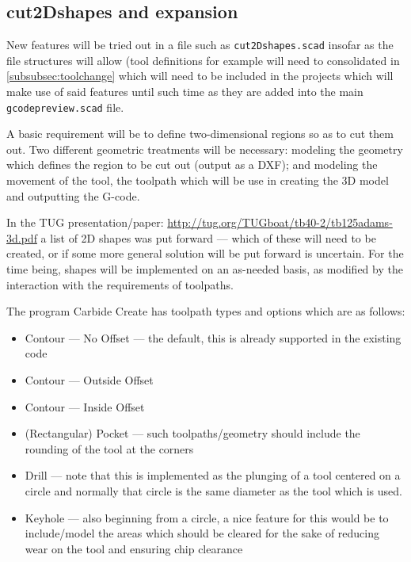 \documentclass{ltxdoc}
\begin{document}
\begin{samepage}
\section{cut2Dshapes and expansion}
 
New features will be tried out in a file such as \texttt{cut2Dshapes.scad} insofar as the 
file structures will allow (tool definitions for example will need to consolidated in 
\ref{subsubsec:toolchange} which will need
to be included in the projects which will make use of said features until such time
as they are added into the main \texttt{gcodepreview.scad} file.

A basic requirement will be to define two-dimensional regions so as to cut them out.
Two different geometric treatments will be necessary: modeling the geometry which 
defines the region to be cut out (output as a DXF); and modeling the movement of the
tool, the toolpath which will be use in creating the 3D model and outputting the 
G-code.

In the TUG presentation/paper: \url{http://tug.org/TUGboat/tb40-2/tb125adams-3d.pdf}
a list of 2D shapes was put forward --- which of these will need to be created,
or if some more general solution will be put forward is uncertain. For the time
being, shapes will be implemented on an as-needed basis, as modified by the
interaction with the requirements of toolpaths.

The program Carbide Create has toolpath types and options which are as follows:

\begin{itemize}
 \item Contour --- No Offset --- the default, this is already supported in the existing code
 \item Contour --- Outside Offset
 \item Contour --- Inside Offset
 \item (Rectangular) Pocket --- such toolpaths/geometry should include the rounding of the tool 
       at the corners 
 \item Drill --- note that this is implemented as the plunging of a tool centered on a circle
                 and normally that circle is the same diameter as the tool which is used.
 \item Keyhole --- also beginning from a circle, a nice feature for this would be to 
                   include/model the areas which should be cleared for the sake of reducing wear
                   on the tool and ensuring chip clearance
\end{itemize}
\end{samepage}
 
\end{document}
